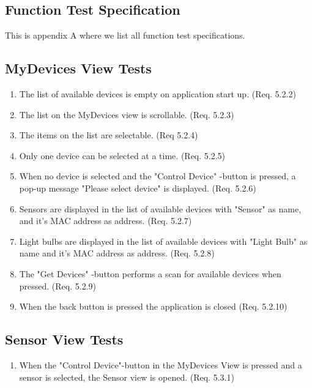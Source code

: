 \documentclass[a4paper]{article}
\newlength{\testlabellength}
\newenvironment{testlist}{\begin{enumerate}[label=\bfseries Test \thesubsection.\arabic* , labelindent=0pt, labelwidth=\testlabellength , leftmargin=2cm]}{\end{enumerate}}
\begin{document}
\newpage
\begin{appendices}

\section{Function Test Specification} \label{appendix:section:functiontest}
This is appendix A where we list all function test specifications.

\subsection{MyDevices View Tests}
\begin{testlist}
	\item The list of available devices is empty on application start up. (Req. 5.2.2)
    \item The list on the MyDevices view is scrollable. (Req. 5.2.3)
   
    \item The items on the list are selectable. (Req 5.2.4)
    \item Only one device can be selected at a time. (Req. 5.2.5)
    \item When no device is selected and the "Control Device" -button is pressed, a pop-up message "Please select device" is displayed. (Req. 5.2.6)
    \item Sensors are displayed in the list of available devices with "Sensor" as name, and it's MAC address as address. (Req. 5.2.7)
    \item Light bulbs are displayed in the list of available devices with "Light Bulb" as name and it's MAC address as address. (Req. 5.2.8)
    \item The "Get Devices" -button performs a scan for available devices when pressed. (Req. 5.2.9)
    \item When the back button is pressed the application is closed (Req. 5.2.10)
\end{testlist}

\subsection{Sensor View Tests}
\begin{testlist}
\item When the "Control Device"-button in the MyDevices View is pressed and a sensor is selected, the Sensor view is opened. (Req. 5.3.1)


\end{testlist}
\end{appendices}
\end{document}
